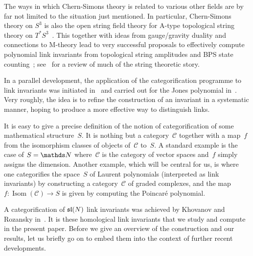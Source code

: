 \documentclass{compositio}
\theoremstyle{definition}
\numberwithin{equation}{section}
\begin{document}
The ways in which Chern-Simons theory is related to various other fields are by far not limited to the situation just mentioned. In particular, Chern-Simons theory on $S^3$ is also the open string field theory for A-type topological string theory on $T^*S^3$~\cite{w9207094}. This together with ideas from gauge/gravity duality and connections to M-theory lead to very successful proposals to effectively compute polynomial link invariants from topological string amplitudes and BPS state counting~\cite{gv9811131, ov9912123, lmv0010102}; see~\cite{marinoknotbook} for a review of much of the string theoretic story. 

\medskip

In a parallel development, the application of the categorification programme to link invariants was initiated in~\cite{cf9405183} and carried out for the Jones polynomial in~\cite{k9908171}. Very roughly, the idea is to refine the construction of an invariant in a systematic manner, hoping to produce a more effective way to distinguish links. 

It is easy to give a precise definition of the notion of categorification of some mathematical structure~$S$. It is nothing but a category~$\mathcal C$ together with a map~$f$ from the isomorphism classes of objects of~$\mathcal C$ to~$S$. A standard example is the case of $S=\nN$ where~$\mathcal C$ is the category of vector spaces and~$f$ simply assigns the dimension. Another example, which will be central for us, is where one categorifies the space~$S$ of Laurent polynomials (interpreted as link invariants) by constructing a category~$\mathcal C$ of graded complexes, and the map $f:\operatorname{Isom}(\mathcal C)\longrightarrow S$ is given by computing the Poincar\'e polynomial. 

A categorification of $\mathfrak{sl}(N)$ link invariants was achieved by Khovanov and Rozansky in~\cite{kr0401268}. It is these homological link invariants that we study and compute in the present paper. Before we give an overview of the construction and our results, let us briefly go on to embed them into the context of further recent developments. 
\end{document}
